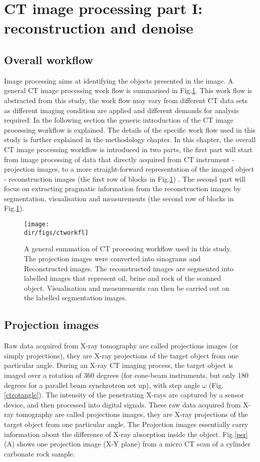 \section{CT image processing part I: reconstruction and denoise}
\subsection{Overall workflow}
Image processing aims at identifying the objects presented in the image. A general CT image processing work flow is summarised in Fig.\ref{ctworkfl}. This work flow is abstracted from this study, the work flow may vary from different CT data sets as different imaging condition are applied and different demands for analysis required. In the following section the generic introduction of the CT image processing workflow is explained. The details of the specific work flow used in this study is further explained in the methodology chapter. In this chapter, the overall CT image processing workflow is introduced in two parts, the first part will start from image processing of data that directly acquired from CT instrument - projection images, to a more straight-forward representation of the imaged object - reconstruction images (the first row of blocks in Fig.\ref{ctworkfl}) . The second part will focus on extracting pragmatic information from the reconstruction images by segmentation, visualisation and measurements (the second row of blocks in Fig.\ref{ctworkfl}).

 \begin{figure}[htbp]
  \centering
  \texttt{[image: \\dir/figs/ctworkfl]}
  \caption{A general summation of CT processing workflow used in this study. The projection images were converted into sinograms and Reconstructed images. The reconstructed images are segmented into labelled images that represent oil, brine and rock of the scanned object. Visualisation and measurements can then be carried out on the labelled segmentation images.}
  \label{ctworkfl}
\end{figure}

\subsection{Projection images} 
Raw data acquired from X-ray tomography are called projections images (or simply projections), they are X-ray projections of the target object from one particular angle. During an X-ray CT imaging process, the target object is imaged over a rotation of 360 degrees (for cone-beam instruments, but only 180 degrees for a parallel beam synchrotron set up), with step angle $\omega$ (Fig.\ref{ctrotangle}). The intensity of the penetrating X-rays are captured by a sensor device, and then processed into digital signals. These raw data acquired from X-ray tomography are called projections images, they are X-ray projections of the target object from one particular angle. The Projection images essentially carry information about the difference of X-ray absorption inside the object. Fig.\ref{psr} (A) shows one projection image (X-Y plane) from a micro CT scan of a cylinder carbonate rock sample.

